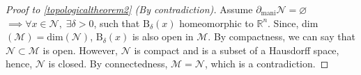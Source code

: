 \documentclass[12pt, a4paper]{report}
\theoremstyle{bfnote}
\begin{document}
\begin{proof}[Proof to \ref{topologicaltheorem2} (By contradiction)]
    Assume $\partial_{\text{mani}}\mathcal{N} = \varnothing$ \newline $\implies
    \forall x \in \mathcal{N}, \;\exists \delta > 0$, such that
    $\text{B}_\delta\left(x\right)$ homeomorphic to $\mathbb{R}^n$.\newline
    Since, dim$\left(\mathcal{M}\right) = \text{dim}\left(\mathcal{N}\right)$,
    $\text{B}_\delta\left(x\right)$ is also open in $\mathcal{M}$. By
    compactness, we can say that $\mathcal{N} \subset \mathcal{M}$ is open. However,
    $\mathcal{N}$ is compact and is a subset of a Hausdorff space, hence,
    $\mathcal{N}$ is closed. By connectedness, $\mathcal{M} = \mathcal{N}$,
    which is a contradiction.
\end{proof}
\end{document}
